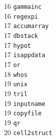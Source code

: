 \begin{footnotesize}
\begin{multicols}{3}
\vspace{-.153cm} 16    \hspace{.2cm} {\tt gammainc            }    \\ %
\vspace{-.153cm} 16    \hspace{.2cm} {\tt regexpi             }    \\ %
\vspace{-.153cm} 17    \hspace{.2cm} {\tt accumarray          }    \\ %
\vspace{-.153cm} 17    \hspace{.2cm} {\tt dbstack             }    \\ %
\vspace{-.153cm} 17    \hspace{.2cm} {\tt hypot               }    \\ %
\vspace{-.153cm} 17    \hspace{.2cm} {\tt isappdata           }    \\ %
\vspace{-.153cm} 17    \hspace{.2cm} {\tt or                  }    \\ %
\vspace{-.153cm} 18    \hspace{.2cm} {\tt whos                }    \\ %
\vspace{-.153cm} 19    \hspace{.2cm} {\tt unix                }    \\ %
\vspace{-.153cm} 19    \hspace{.2cm} {\tt tril                }    \\ %
\vspace{-.153cm} 19    \hspace{.2cm} {\tt inputname           }    \\ %
\vspace{-.153cm} 19    \hspace{.2cm} {\tt copyfile            }    \\ %
\vspace{-.153cm} 19    \hspace{.2cm} {\tt qr                  }    \\ %
\vspace{-.153cm} 20    \hspace{.2cm} {\tt cell2struct         }    \\ %

\end{multicols}
\end{footnotesize}
